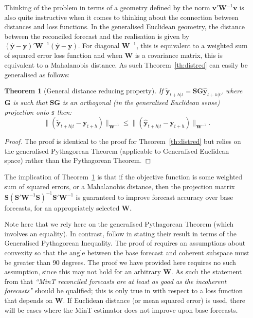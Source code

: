 \documentclass[12pt]{article}
\newtheorem{theo}{Theorem}[section]
\theoremstyle{definition}
\theoremstyle{property}
\begin{document}
	Thinking of the problem in terms of a geometry defined by the norm $\bm{v}'\bm{W}^{-1}\bm{v}$ is also quite instructive when it comes to thinking about the connection between distances and loss functions.  In the generalised Euclidean geometry, the distance between the reconciled forecast and the realisation is given by $(\hat{\bm{y}}-\bm{y})'\bm{W}^{-1}(\hat{\bm{y}}-\bm{y})$.  For diagonal $\bm{W}^{-1}$, this is equivalent to a weighted sum of squared error loss function and when $\bm{W}$ is a covariance matrix, this is equivalent to a Mahalanobis distance.  As such Theorem~\ref{th:distred} can easily be generalised as follows:
	
	\begin{theo}[General distance reducing property]\label{th:gdistred}
        If $\tilde{\bm{y}}_{t+h|t}=\bm{S}\bm{G}\hat{\bm{y}}_{t+h|t}$, where $\bm{G}$ is such that $\bm{S}\bm{G}$ is an orthogonal (in the generalised Euclidean sense) projection onto $\mathfrak{s}$ then:
		\begin{equation}
		\|(\tilde{\bm{y}}_{t+h|t}-\bm{y}_{t+h})\|_{{\bm W}^{-1}}\le\|(\hat{\bm{y}}_{t+h|t}-\bm{y}_{t+h})\|_{{\bm W}^{-1}}.
		\end{equation}
	\end{theo}
	\begin{proof}
    The proof is identical to the proof for Theorem~\ref{th:distred} but relies on the generalised Pythagorean Theorem (applicable to Generalised Euclidean space) rather than the Pythagorean Theorem.
    \end{proof}  
	
	The implication of Theorem~\ref{th:gdistred} is that if the objective function is some weighted sum of squared errors, or a Mahalanobis distance, then the projection matrix $\bm{S}\left(\bm{S}'\bm{W}^{-1}\bm{S}\right)^{-1}\bm{S}'\bm{W}^{-1}$ is guaranteed to improve forecast accuracy over base forecasts, for an appropriately selected $\bm{W}$.
	
	Note here that we rely here on the generalised Pythagorean Theorem (which involves an equality).  In contrast, \cite{WicEtAl2019} follow \cite{VanErven2015a} in stating their result in terms of the Generalised Pythagorean Inequality.  The proof of \cite{WicEtAl2019} requires an assumptions about convexity so that the angle between the base forecast and coherent subspace must be greater than 90 degrees.  The proof we have provided here requires no such assumption, since this may not hold for an arbitrary $\bm{W}$.  As such the statement from \cite{WicEtAl2019} that {\em``MinT reconciled forecasts are at least as good as the incoherent forecasts''} should be qualified; this is only true in with respect to a loss function that depends on ${\bm W}$.  If Euclidean distance (or mean squared error) is used, there will be cases where the MinT estimator does not improve upon base forecasts.
	
\end{document}
